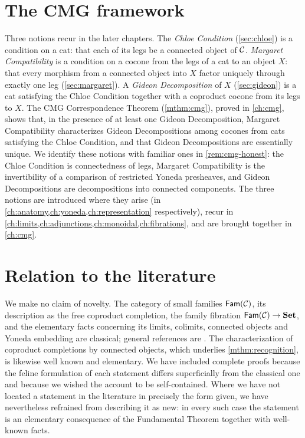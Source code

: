 \section{The CMG framework}

Three notions recur in the later chapters. The \emph{Chloe Condition}
(\cref{sec:chloe}) is a condition on a cat: that each of its legs be a connected object of $\mathcal{C}$.
\emph{Margaret Compatibility} is a condition on a cocone from the legs of a
cat to an object $X$: that every morphism from a connected object into $X$
factor uniquely through exactly one leg (\cref{sec:margaret}). A
\emph{Gideon Decomposition} of $X$ (\cref{sec:gideon}) is a cat satisfying the Chloe Condition together with a coproduct cocone
from its legs to $X$. The CMG Correspondence Theorem (\cref{mthm:cmg}),
proved in \cref{ch:cmg}, shows
that, in the presence of at least one Gideon Decomposition, Margaret
Compatibility characterizes Gideon Decompositions among cocones from cats
satisfying the Chloe Condition, and that Gideon Decompositions are essentially
unique. We identify these notions with familiar ones in
\cref{rem:cmg-honest}: the Chloe Condition is connectedness of legs, Margaret
Compatibility is the invertibility of a comparison of restricted Yoneda
presheaves, and Gideon Decompositions are decompositions into connected
components. The three notions are introduced where they arise (in
\cref{ch:anatomy,ch:yoneda,ch:representation} respectively), recur in
\cref{ch:limits,ch:adjunctions,ch:monoidal,ch:fibrations}, and are brought
together in \cref{ch:cmg}.

\section{Relation to the literature}

We make no claim of novelty. The category of small families $\mathsf{Fam}(\mathcal{C})$, its
description as the free coproduct completion, the family fibration
$\mathsf{Fam}(\mathcal{C})\to\mathbf{Set}$, and the elementary facts concerning its limits,
colimits, connected objects and Yoneda embedding are classical; general
references are \cite{Borceux1994,Jacobs1999,Johnstone2002,MacLane1998,Riehl2016}.
The characterization of coproduct completions by connected objects, which
underlies \cref{mthm:recognition}, is likewise well known and elementary. We have included
complete proofs because the feline formulation of each statement differs
superficially from the classical one and because we wished the account to be
self-contained. Where we have not located a statement in the literature in
precisely the form given, we have nevertheless refrained from describing it as
new: in every such case the statement is an elementary consequence of the
Fundamental Theorem together with well-known facts.

